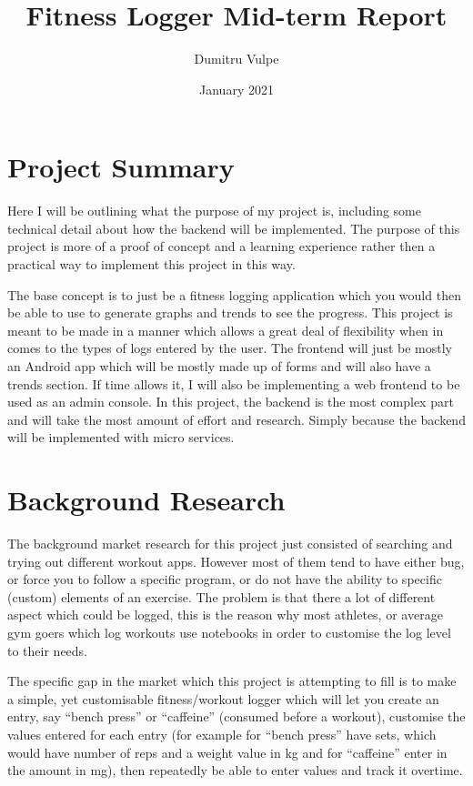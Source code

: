 \documentclass[11pt]{article}
\title{Fitness Logger Mid-term Report}
\author{Dumitru Vulpe}
\date{January 2021}
\begin{document}
\maketitle
\tableofcontents
\newpage

\section{Project Summary}

Here I will be outlining what the purpose of my project is, including some technical detail about how the backend will be implemented. The purpose of this project is more of a proof of concept and a learning experience rather then a practical way to implement this project in this way. \par

The base concept is to just be a fitness logging application which you would then be able to use to generate graphs and trends to see the progress. This project is meant to be made in a manner which allows a great deal of flexibility when in comes to the types of logs entered by the user. The frontend will just be mostly an Android app which will be mostly made up of forms and will also have a trends section. If time allows it, I will also be implementing a web frontend to be used as an admin console. In this project, the backend is the most complex part and will take the most amount of effort and research. Simply because the backend will be implemented with micro services. \par

\section{Background Research}

The background market research for this project just consisted of searching and trying out different workout apps. However most of them tend to have either bug, or force you to follow a specific program, or do not have the ability to specific (custom) elements of an exercise. The problem is that there a lot of different aspect which could be logged, this is the reason why most athletes, or average gym goers which log workouts use notebooks in order to customise the log level to their needs.  \par

The specific gap in the market which this project is attempting to fill is to make a simple, yet customisable fitness/workout logger which will let you create an entry, say ``bench press'' or ``caffeine'' (consumed before a workout), customise the values entered for each entry (for example for ``bench press'' have sets, which would have number of reps and a weight value in kg and for ``caffeine'' enter in the amount in mg), then repeatedly be able to enter values and track it overtime. \par
\end{document}
